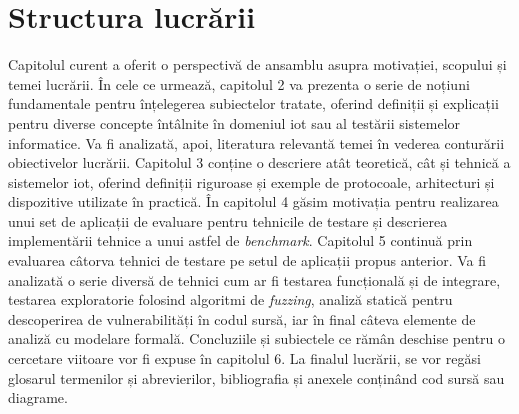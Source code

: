 \section{Structura lucrării}

Capitolul curent a oferit o perspectivă de ansamblu asupra motivației, scopului și temei lucrării. În cele ce urmează, capitolul 2 va prezenta o serie de noțiuni fundamentale pentru înțelegerea subiectelor tratate, oferind definiții și explicații pentru diverse concepte întâlnite în domeniul \acrshort{iot} sau al testării sistemelor informatice. Va fi analizată, apoi, literatura relevantă temei în vederea conturării obiectivelor lucrării. Capitolul 3 conține o descriere atât teoretică, cât și tehnică a sistemelor \acrshort{iot}, oferind definiții riguroase și exemple de protocoale, arhitecturi și dispozitive utilizate în practică. În capitolul 4 găsim motivația pentru realizarea unui set de aplicații de evaluare pentru tehnicile de testare și descrierea implementării tehnice a unui astfel de \textit{benchmark}. Capitolul 5 continuă prin evaluarea câtorva tehnici de testare pe setul de aplicații propus anterior. Va fi analizată o serie diversă de tehnici cum ar fi testarea funcțională și de integrare, testarea exploratorie folosind algoritmi de \textit{fuzzing}, analiză statică pentru descoperirea de vulnerabilități în codul sursă, iar în final câteva elemente de analiză cu modelare formală. Concluziile și subiectele ce rămân deschise pentru o cercetare viitoare vor fi expuse în capitolul 6. La finalul lucrării, se vor regăsi glosarul termenilor și abrevierilor, bibliografia și anexele conținând cod sursă sau diagrame.
